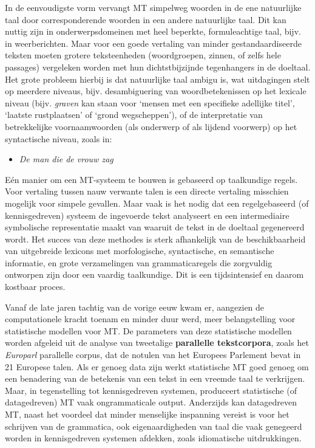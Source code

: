 \documentclass[]{../../metanetpaper}
\begin{document}
\begin{multicols}{2}

    In de eenvoudigste vorm vervangt MT simpelweg woorden in de ene natuurlijke taal door corresponderende woorden in een andere natuurlijke taal. Dit kan nuttig zijn in onderwerpsdomeinen met heel beperkte, formuleachtige taal, bijv. in weerberichten. Maar voor een goede vertaling van minder gestandaardiseerde teksten moeten grotere teksteenheden (woordgroepen, zinnen, of zelfs hele passages) vergeleken worden met hun dichtstbijzijnde tegenhangers in de doeltaal. Het grote probleem hierbij is dat natuurlijke taal ambigu is, wat uitdagingen stelt op meerdere niveaus, bijv. desambiguering van woordbetekenissen op het lexicale niveau (bijv. \emph{graven} kan staan voor `mensen met een specifieke adellijke titel', `laatste rustplaatsen' of `grond wegscheppen'), of de interpretatie van betrekkelijke voornaamwoorden (als onderwerp of als lijdend voorwerp) op het syntactische niveau, zoals in:\\

   \begin{itemize}
     \item    \emph{De man die de vrouw zag}
   \end{itemize}
 

    E{\'e}n manier om een MT-systeem te bouwen is gebaseerd op taalkundige regels. Voor vertaling tussen nauw verwante talen is een directe vertaling misschien mogelijk voor simpele gevallen. Maar vaak is het nodig dat een regelgebaseerd (of kennisgedreven) systeem de ingevoerde tekst analyseert en een intermediaire symbolische representatie maakt van waaruit de tekst in de doeltaal gegenereerd wordt. Het succes van deze methodes is sterk afhankelijk van de beschikbaarheid van uitgebreide lexicons met morfologische, syntactische, en semantische informatie, en grote verzamelingen van grammaticaregels die zorgvuldig ontworpen zijn door een vaardig taalkundige. Dit is een tijdsintensief en daarom kostbaar proces.


    Vanaf de late jaren tachtig van de vorige eeuw kwam er, aangezien de computationele kracht toenam en minder duur werd, meer belangstelling voor statistische modellen voor MT. De parameters van deze statistische modellen worden afgeleid uit de analyse van tweetalige \textbf{parallelle tekstcorpora}, zoals het \emph{Europarl} parallelle corpus, dat de notulen van het Europees Parlement bevat in 21 Europese talen. Als er genoeg data zijn werkt statistische MT goed genoeg om een benadering van de betekenis van een tekst in een vreemde taal te verkrijgen. Maar, in tegenstelling tot kennisgedreven systemen, produceert statistische (of datagedreven) MT vaak ongrammaticale output. Anderzijds kan datagedreven MT, naast het voordeel dat minder menselijke inspanning vereist is voor het schrijven van de grammatica, ook eigenaardigheden van  taal die vaak genegeerd worden in kennisgedreven systemen afdekken, zoals idiomatische uitdrukkingen.


\end{multicols}
\end{document}
